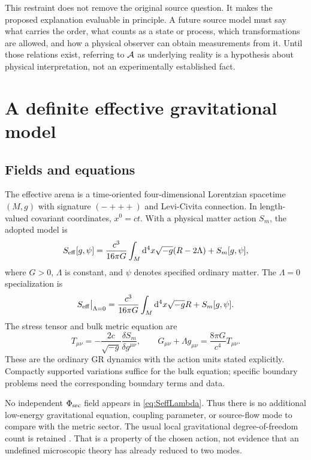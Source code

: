 \documentclass[11pt]{article}
\begin{document}
This restraint does not remove the original source question. It makes the proposed explanation evaluable in principle. A future source model must say what carries the order, what counts as a state or process, which transformations are allowed, and how a physical observer can obtain measurements from it. Until those relations exist, referring to $\mathcal A$ as underlying reality is a hypothesis about physical interpretation, not an experimentally established fact.

\section{A definite effective gravitational model}
\subsection{Fields and equations}
The effective arena is a time-oriented four-dimensional Lorentzian spacetime $(M,g)$ with signature $(-+++)$ and Levi-Civita connection. In length-valued covariant coordinates, $x^0=ct$. With a physical matter action $S_m$, the adopted model is
\begin{equation}
S_{\rm eff}[g,\psi]=\frac{c^3}{16\pi G}
\int_M\mathrm d^4x\sqrt{-g}(R-2\Lambda)+S_m[g,\psi],
\label{eq:SeffLambda}
\end{equation}
where $G>0$, $\Lambda$ is constant, and $\psi$ denotes specified ordinary matter. The $\Lambda=0$ specialization is
\begin{equation}
S_{\rm eff}\big|_{\Lambda=0}=\frac{c^3}{16\pi G}
\int_M\mathrm d^4x\sqrt{-g}R+S_m[g,\psi].
\label{eq:Seff}
\end{equation}
The stress tensor and bulk metric equation are
\begin{equation}
T_{\mu\nu}=-\frac{2c}{\sqrt{-g}}\frac{\delta S_m}{\delta g^{\mu\nu}},
\qquad G_{\mu\nu}+\Lambda g_{\mu\nu}=\frac{8\pi G}{c^4}T_{\mu\nu}.
\label{eq:Einstein}
\end{equation}
These are the ordinary GR dynamics with the action units stated explicitly. Compactly supported variations suffice for the bulk equation; specific boundary problems need the corresponding boundary terms and data.

No independent $\Phi_{\mathrm{src}}$ field appears in \eqref{eq:SeffLambda}. Thus there is no additional low-energy gravitational equation, coupling parameter, or source-flow mode to compare with the metric sector. The usual local gravitational degree-of-freedom count is retained \parencite{ADM1962}. That is a property of the chosen action, not evidence that an undefined microscopic theory has already reduced to two modes.
\end{document}
